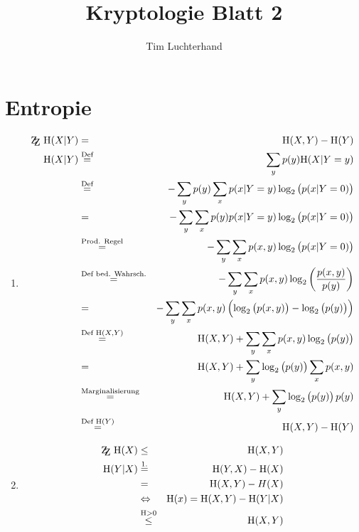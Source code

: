 \documentclass[DIN, pagenumber=false, fontsize=11pt, parskip=half]{scrartcl}
\title{Kryptologie Blatt 2}
\author{Tim Luchterhand}
\newcommand{\ZZ}{\mathrm{Z\kern-.3em\raise-0.5ex\hbox{Z}}}
\newcommand{\Ent}{\text{H}}
\begin{document}
    \maketitle
    \setcounter{section}{1}
    \section{Entropie}
    \begin{enumerate}
        \item 
            \begin{eqnarray}
                \ZZ \ \Ent(X | Y) &=& \Ent(X, Y) - \Ent(Y) \\
                \Ent(X | Y) &\stackrel{\text{Def}}{=}& \sum_y{p(y) \Ent(X | Y = y)} \\
                &\stackrel{\text{Def}}{=}& - \sum_y{p(y) \sum_x{p(x | Y = y) \log_2\left(p(x | Y = 0)\right)}} \\
                &=& - \sum_y{\sum_x{p(y) p(x | Y = y) \log_2\left(p(x | Y = 0)\right)}} \\
                &\stackrel{\text{Prod. Regel}}{=}& - \sum_y{\sum_x{p(x, y) \log_2\left(p(x | Y = 0)\right)}} \\
                &\stackrel{\text{Def bed. Wahrsch.}}{=}& - \sum_y{\sum_x{p(x, y) \log_2\left(\frac{p(x,y)}{p(y)}\right)}} \\
                &=& - \sum_y{\sum_x{p(x, y) \left(\log_2\left(p(x, y)\right) - \log_2\left(p(y)\right)\right)}} \\
                &\stackrel{\text{Def } \Ent(X, Y)}{=}& \Ent(X, Y) + \sum_y{\sum_x{p(x, y) \log_2\left(p(y)\right)}} \\
                &=& \Ent(X, Y) + \sum_y{\log_2\left(p(y)\right) \sum_x{p(x, y) }} \\
                &\stackrel{\text{Marginalisierung}}{=}& \Ent(X, Y) + \sum_y{\log_2\left(p(y)\right) p(y)} \\
                &\stackrel{\text{Def } \Ent(Y)}{=}& \Ent(X, Y) - \Ent(Y)
            \end{eqnarray}
        \item
            \begin{eqnarray*}
                \ZZ \ \Ent(X) &\leq& \Ent(X, Y) \\
                \Ent(Y | X) &\stackrel{1.}{=}& \Ent(Y, X) - \Ent(X) \\
                &=& \Ent(X, Y) - H(X) \\
                &\Leftrightarrow& \Ent(x) = \Ent(X, Y) - \Ent(Y | X) \\
                &\stackrel{\Ent > 0}{\leq}& \Ent(X, Y)
            \end{eqnarray*}
    \end{enumerate}
\end{document}
